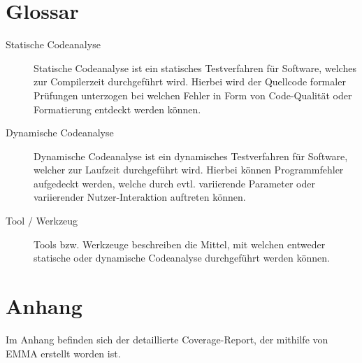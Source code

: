 \section{Glossar}
\begin{description}
	\item[Statische Codeanalyse]
	Statische Codeanalyse ist ein statisches Testverfahren für Software, welches zur Compilerzeit durchgeführt wird. Hierbei wird der Quellcode formaler Prüfungen unterzogen bei welchen Fehler in Form von Code-Qualität oder Formatierung entdeckt werden können.
		
	\item[Dynamische Codeanalyse]
	Dynamische Codeanalyse ist ein dynamisches Testverfahren für Software, welcher zur Laufzeit durchgeführt wird. Hierbei können Programmfehler aufgedeckt werden, welche durch evtl. variierende Parameter oder variierender Nutzer-Interaktion auftreten können.
		
	\item[Tool / Werkzeug]
	Tools bzw. Werkzeuge beschreiben die Mittel,  mit welchen entweder statische oder dynamische Codeanalyse durchgeführt werden können.
\end{description}


\section{Anhang}
Im Anhang befinden sich der detaillierte Coverage-Report, der mithilfe von EMMA erstellt worden ist.